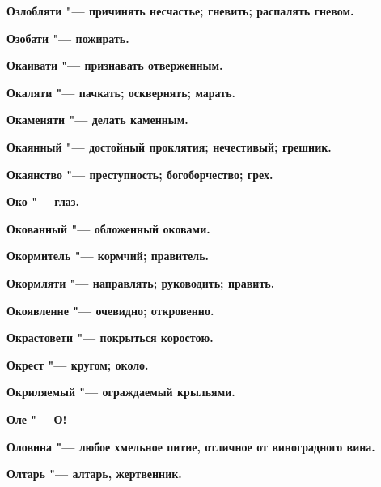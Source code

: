 \begin{mymulticols}{2}
\bfseries Озлобляти\normalfont{} "--- причинять несчастье; гневить; распалять гневом. 




\bfseries Озобати\normalfont{} "--- пожирать. 




\bfseries Окаивати\normalfont{} "--- признавать отверженным. 




\bfseries Окаляти\normalfont{} "--- пачкать; осквернять; марать. 




\bfseries Окаменяти\normalfont{} "--- делать каменным. 




\bfseries Окаянный\normalfont{} "--- достойный проклятия; нечестивый; грешник. 




\bfseries Окаянство\normalfont{} "--- преступность; богоборчество; грех. 




\bfseries Око\normalfont{} "--- глаз. 




\bfseries Окованный\normalfont{} "--- обложенный оковами. 




\bfseries Окормитель\normalfont{} "--- кормчий; правитель. 




\bfseries Окормляти\normalfont{} "--- направлять; руководить; править. 




\bfseries Окоявленне\normalfont{} "--- очевидно; откровенно. 




\bfseries Окрастовети\normalfont{} "--- покрыться коростою. 




\bfseries Окрест\normalfont{} "--- кругом; около. 




\bfseries Окриляемый\normalfont{} "--- ограждаемый крыльями. 




\bfseries Оле\normalfont{} "--- О! 




\bfseries Оловина\normalfont{} "--- любое хмельное питие, отличное от виноградного вина. 




\bfseries Олтарь\normalfont{} "--- алтарь, жертвенник. 





\end{mymulticols}
